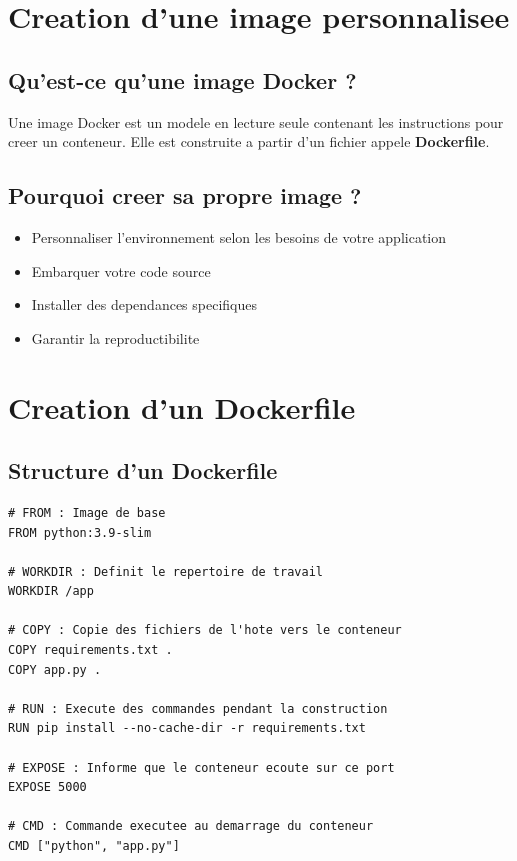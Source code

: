 \documentclass[a4paper,12pt]{article}
\begin{document}
\section{Creation d'une image personnalisee}

\subsection{Qu'est-ce qu'une image Docker ?}
Une image Docker est un modele en lecture seule contenant les instructions pour creer un conteneur. Elle est construite a partir d'un fichier appele \textbf{Dockerfile}.

\subsection{Pourquoi creer sa propre image ?}
\begin{itemize}
    \item Personnaliser l'environnement selon les besoins de votre application
    \item Embarquer votre code source
    \item Installer des dependances specifiques
    \item Garantir la reproductibilite
\end{itemize}

\section{Creation d'un Dockerfile}

\subsection{Structure d'un Dockerfile}
\begin{lstlisting}[caption=Instructions de base d'un Dockerfile]
# FROM : Image de base
FROM python:3.9-slim

# WORKDIR : Definit le repertoire de travail
WORKDIR /app

# COPY : Copie des fichiers de l'hote vers le conteneur
COPY requirements.txt .
COPY app.py .

# RUN : Execute des commandes pendant la construction
RUN pip install --no-cache-dir -r requirements.txt

# EXPOSE : Informe que le conteneur ecoute sur ce port
EXPOSE 5000

# CMD : Commande executee au demarrage du conteneur
CMD ["python", "app.py"]
\end{lstlisting}
\end{document}
